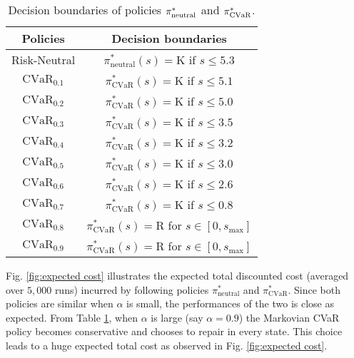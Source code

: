 \documentclass[12pt,technote,onecolumn]{IEEEtran}
\begin{document}
\begin{table}[!tph]
	\centering
	\caption{Decision boundaries of policies
		$\pi_{\text{\textnormal {neutral}}}^{*}$ and $\pi_{\text{CV\textnormal{a}R}}^{*}$. 
		\label{tab:decision boundaries}}
	\begin{tabular}{|c|c|}
		\hline
		Policies            & Decision boundaries                                                     \\ \hline
		Risk-Neutral        & $\pi^*_{\text{neutral}}\left(s\right)=\text{K}$ if $s\leq5.3$                    \\ \hline
		$\text{CVaR}_{0.1}$ & $\pi^*_{\text{CVaR}}\left(s\right)=\text{K}$ if $s\leq5.1$                       \\ \hline
		$\text{CVaR}_{0.2}$ & $\pi^*_{\text{CVaR}}\left(s\right)=\text{K}$ if $s\leq5.0$                       \\ \hline
		$\text{CVaR}_{0.3}$ & $\pi^*_{\text{CVaR}}\left(s\right)=\text{K}$ if $s\leq3.5$                       \\ \hline
		$\text{CVaR}_{0.4}$ & $\pi^*_{\text{CVaR}}\left(s\right)=\text{K}$ if $s\leq3.2$                       \\ \hline
		$\text{CVaR}_{0.5}$ & $\pi^*_{\text{CVaR}}\left(s\right)=\text{K}$ if $s\leq3.0$                       \\ \hline
		$\text{CVaR}_{0.6}$ & $\pi^*_{\text{CVaR}}\left(s\right)=\text{K}$ if $s\leq2.6$                       \\ \hline
		$\text{CVaR}_{0.7}$ & $\pi^*_{\text{CVaR}}\left(s\right)=\text{K}$ if $s\leq0.8$                       \\ \hline
		$\text{CVaR}_{0.8}$ & $\pi^*_{\text{CVaR}}\left(s\right)=\text{R}$ for $s\in\left[0,s_{\max}\right]$ \\ \hline
		$\text{CVaR}_{0.9}$ & $\pi^*_{\text{CVaR}}\left(s\right)=\text{R}$ for $s\in\left[0,s_{\max}\right]$ \\ \hline
	\end{tabular}
\end{table}

Fig. \ref{fig:expected cost} illustrates the expected total discounted
cost (averaged over $5,000$ runs) incurred by following policies
$\pi_{\text{neutral}}^{*}$ and $\pi_{\text{CVaR}}^{*}.$ Since both policies are
similar when $\alpha$ is small, the performances of the two is close
as expected. From Table \ref{tab:decision boundaries}, when $\alpha$
is large (say $\alpha=0.9$) the Markovian CVaR policy becomes conservative
and chooses to repair in every state. This choice leads to a huge
expected total cost as observed in Fig. \ref{fig:expected cost}.
\end{document}
